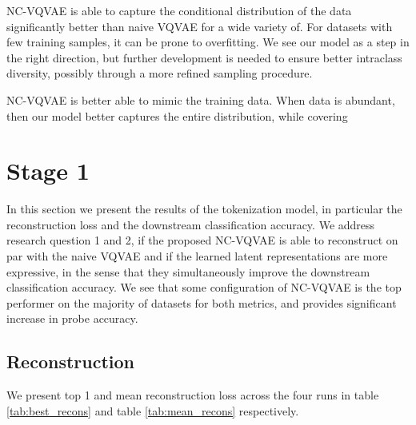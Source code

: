 \documentclass[../../thesis.tex]{subfiles}
\begin{document}
NC-VQVAE is able to capture the conditional distribution of the data significantly better than naive VQVAE for a wide variety of. For datasets with few training samples, it can be prone to overfitting. We see our model as a step in the right direction, but further development is needed to ensure better intraclass diversity, possibly through a more refined sampling procedure. \newline

NC-VQVAE is better able to mimic the training data. When data is abundant, then our model better captures the entire distribution, while covering \newline





\section{Stage 1}
In this section we present the results of the tokenization model, in particular the reconstruction loss and the downstream classification accuracy. We address research question 1 and 2, if the proposed NC-VQVAE is able to reconstruct on par with the naive VQVAE and if the learned latent representations are more expressive, in the sense that they simultaneously improve the downstream classification accuracy. We see that some configuration of NC-VQVAE is the top performer on the majority of datasets for both metrics, and provides significant increase in probe accuracy. 

\subsection{Reconstruction}

We present top 1 and mean reconstruction loss across the four runs in table \ref{tab:best_recons} and table \ref{tab:mean_recons} respectively.
\end{document}
